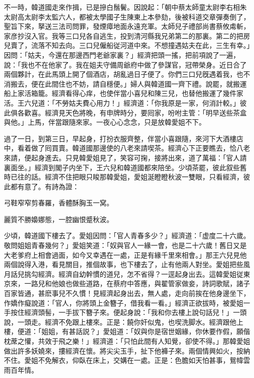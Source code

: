 不一時，韓道國走來作揖，已是摻白鬚鬢。因說起：「朝中蔡太師童太尉李右相朱太尉高太尉李太監六人，都被太學國子生陳東上本參劾，後被科道交章彈奏倒了，聖旨下來，拏送三法司問罪，發煙瘴地面永遠充軍。太師兒子禮部尚書蔡攸䖏斬，家彦抄沒入官。我等三口兒各自逃生，投到清河縣我兄弟第二的那裏。第二的把房兒賣了，流落不知去向。三口兒僱船従河道中來。不想撞遇姑夫在此，三生有幸。」因問：「姑夫，今還在那邊西門老爺家裏？」經濟把頭一搖，把前項說了一遍，說：「我也不在他家了。我在姐夫守備周爺府中做了參謀官，冠帶榮身。近日合了兩個夥計，在此馬頭上開了個酒店，胡亂過日子便了。你們三口兒旣遇着我，也不消搬去，便在此間住也不妨，請自穩便。」婦人與韓道國一齊下禮。說罷，就搬運船上家活箱籠。經濟看得心痒，也使伴當小喜兒和陳三兒，也替他搬運了幾件家活。王六兒道：「不勞姑夫費心用力！」經濟道：「你我原是一家，何消計較。」彼此俱各歡喜。經濟見天色將晚，有申牌時分，要囘家，吩咐主管：「明早送些茶盒與他。」上馬，伴當跟隨來家。一夜心心念念，只是放韓愛姐不下。

過了一日，到第三日，早起身，打扮衣服齊整，伴當小喜跟隨，來河下大酒樓店中，看着做了囘買賣。韓道國那邊使的八老來請喫茶。經濟心下正要瞧去，恰八老來請，便起身進去。只見韓愛姐見了，笑容可掬，接將出來，道了萬福：「官人請裏面坐。」經濟到閣子内坐下，王六兒和韓道國都來陪坐。少頃茶罷，彼此叙些舊時已往的話。經濟不住把眼只睃那韓愛姐，愛姐涎瞪瞪秋波一雙眼，只看經濟，彼此都有意了。有詩為證：

\begin{myquote}
弓鞋窄窄剪春羅，香體酥胸玉一窝。

麗質不勝嬝娜態，一腔幽恨蹙秋波。
\end{myquote}

少頃，韓道國下樓去了。愛姐因問：「官人青春多少？」經濟道：「虚度二十六歲。敬問姐姐青春幾何？」愛姐笑道：「奴與官人一緣一會，也是二十六歲！舊日又是大老爹府上相會過面，如今又幸遇在一處，正是有緣千里來相會。」那王六兒見他兩個說得入港，看見關目，推個故事，也下樓去了，止有他兩人對坐。愛姐把些風月話兒挑勾經濟。經濟自幼幹慣的道兒，怎不省得？一逕起身出去。這韓愛姐従東京來，一路兒和他娘也做些道路，在蔡府中答應，與翟管家做妾，詩詞歌賦，諸子百家皆通，甚麽事兒不久慣！見經濟起身出去，無人處，走向前挨在他身邊坐下，作嬌作癡說道：「官人，你將頭上金簪子，借我看一看。」經濟正欲拔時，被愛姐一手按住經濟頭髻，一手拔下簪子來。便起身說：「我和你去樓上說句話兒！」一頭說，一頭走。經濟不免跟上樓來。正是：饒你奸似鬼，也喫洗脚水。經濟跟他上樓，便道：「姐姐，有甚話説？」愛姐道：「奴與你是宿世姻緣，你休要作假，願偕枕蓆之懽，共效于飛之樂！」經濟道：「只怕此間有人知覺，卻使不得。」那韓愛姐做出許多妖嬈來，摟經濟在懷。將尖尖玉手，扯下他褲子來。兩個情興如火，按納不住。愛姐不免解衣，仰臥在床上，交媾在一處。正是：色膽如天怕甚事，鴛幃雲雨百年情。

